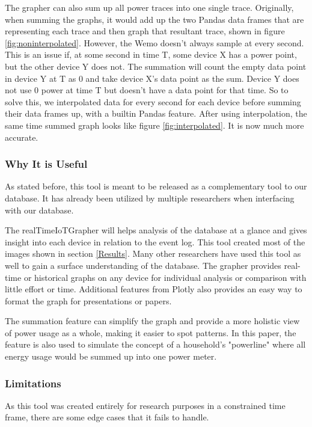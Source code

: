 The grapher can also sum up all power traces into one single trace. Originally, when summing the graphs, it would add up the two Pandas data frames that are representing each trace and then graph that resultant trace, shown in figure \ref{fig:noninterpolated}. However, the Wemo doesn't always sample at every second. This is an issue if, at some second in time T, some device X has a power point, but the other device Y does not. The summation will count the empty data point in device Y at T as 0 and take device X's data point as the sum. Device Y does not use 0 power at time T but doesn't have a data point for that time. So to solve this, we interpolated data for every second for each device before summing their data frames up, with a builtin Pandas feature. After using interpolation, the same time summed graph looks like figure \ref{fig:interpolated}. It is now much more accurate.

\subsubsection{Why It is Useful}
As stated before, this tool is meant to be released as a complementary tool to our database. It has already been utilized by multiple researchers when interfacing with our database.

The realTimeIoTGrapher will helps analysis of the database at a glance and gives insight into each device in relation to the event log.  This tool created most of the images shown in section \ref{Results}. Many other researchers have used this tool as well to gain a surface understanding of the database. The grapher provides real-time or historical graphs on any device for individual analysis or comparison with little effort or time. Additional features from Plotly also provides an easy way to format the graph for presentations or papers.

The summation feature can simplify the graph and provide a more holistic view of power usage as a whole, making it easier to spot patterns. In this paper, the feature is also used to simulate the concept of a household's "powerline" where all energy usage would be summed up into one power meter.

\subsubsection{Limitations}
As this tool was created entirely for research purposes in a constrained time frame, there are some edge cases that it fails to handle.


